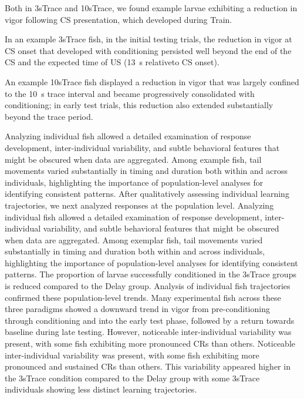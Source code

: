 Both in 3sTrace and 10sTrace, we found example larvae exhibiting a reduction in vigor following CS presentation, which developed during Train.

In an example 3sTrace fish, in the initial testing trials, the reduction in vigor at CS onset that developed with conditioning persisted well beyond the end of the CS and the expected time of US (\SI{13}{\second} relativeto CS onset).

An example 10sTrace fish displayed a reduction in vigor that was largely confined to the \SI{10}{\second} trace interval and became progressively consolidated with conditioning; in early test trials, this reduction also extended substantially beyond the trace period.


Analyzing individual fish allowed a detailed examination of response development, inter-individual variability, and subtle behavioral features that might be obscured when data are aggregated. Among example fish, tail movements varied substantially in timing and duration both within and across individuals, highlighting the importance of population-level analyses for identifying consistent patterns. After qualitatively assessing individual learning trajectories, we next analyzed responses at the population level.
Analyzing individual fish allowed a detailed examination of response development, inter-individual variability, and subtle behavioral features that might be obscured when data are aggregated.
Among exemplar fish, tail movements varied substantially in timing and duration both within and across individuals, highlighting the importance of population-level analyses for identifying consistent patterns.
The proportion of larvae successfully conditioned in the 3sTrace groups is reduced compared to the Delay group.
Analysis of individual fish trajectories confirmed these population-level trends. Many experimental fish across these three paradigms showed a downward trend in vigor from pre-conditioning through conditioning and into the early test phase, followed by a return towards baseline during late testing. However, noticeable inter-individual variability was present, with some fish exhibiting more pronounced CRs than others.
Noticeable inter-individual variability was present, with some fish exhibiting more pronounced and sustained CRs than others. This variability appeared higher in the 3sTrace condition compared to the Delay group with some 3sTrace individuals showing less distinct learning trajectories.

